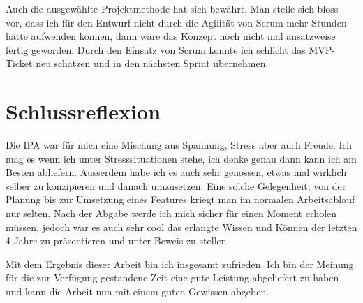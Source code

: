 Auch die ausgewählte Projektmethode hat sich bewährt. Man stelle sich bloss vor, dass ich für den Entwurf nicht durch die Agilität von Scrum mehr
Stunden hätte aufwenden können, dann wäre das Konzept noch nicht mal ansatzweise fertig geworden. Durch den Einsatz von Scrum konnte ich schlicht das MVP-Ticket
neu schätzen und in den nächsten Sprint übernehmen.

\section{Schlussreflexion}
Die IPA war für mich eine Mischung aus Spannung, Stress aber auch Freude. Ich mag es wenn ich unter Stresssituationen stehe, ich denke genau dann kann ich am Besten abliefern.
Ausserdem habe ich es auch sehr genossen, etwas mal wirklich selber zu konzipieren und danach umzusetzen. Eine solche Gelegenheit, von der Planung bis zur Umsetzung eines Features
kriegt man im normalen Arbeitsablauf nur selten. Nach der Abgabe werde ich mich sicher für einen Moment erholen müssen, jedoch war es auch sehr cool das erlangte Wissen und Können der
letzten 4 Jahre zu präsentieren und unter Beweis zu stellen. 

Mit dem Ergebnis dieser Arbeit bin ich insgesamt zufrieden. Ich bin der Meinung für die zur Verfügung gestandene Zeit
eine gute Leistung abgeliefert zu haben und kann die Arbeit nun mit einem guten Gewissen abgeben.
